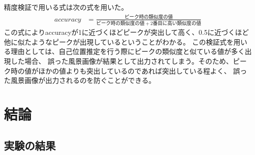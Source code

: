 \documentclass[titlepage,dvipdfmx]{jsarticle}
\begin{document}
精度検証で用いる式は次の式を用いた。
\begin{align}
  accuracy &= \frac{ピーク時の類似度の値}{ピーク時の類似度の値 + 2番目に高い類似度の値}
\end{align}
この式によりaccuracyが1に近づくほどピークが突出して高く、0.5に近づくほど他に似たようなピークが出現しているということがわかる。
この検証式を用いる理由としては、自己位置推定を行う際にピークの類似度と似ている値が多く出現した場合、
誤った風景画像が結果として出力されてしまう。そのため、ピーク時の値がほかの値よりも突出しているのであれば突出している程よく、
誤った風景画像が出力されるのを防ぐことができる。

\section{結論}
\subsection{実験の結果}
\end{document}
